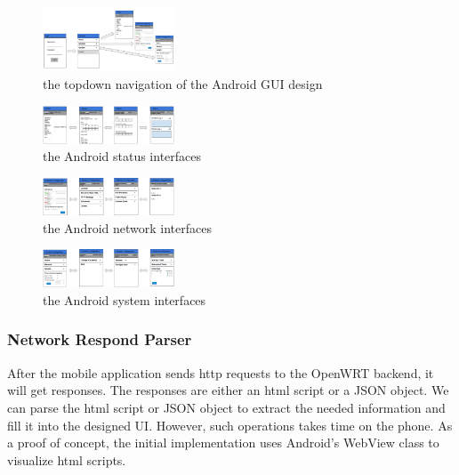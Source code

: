 	\begin{figure}[h!]
		\centering
		\includegraphics[width=0.35\textwidth]{UItopdown.png}
		\caption{the topdown navigation of the Android GUI design}
		\label{OpenWRT:androidtopdown}
	\end{figure}
	\begin{figure}[h!]
		\centering
		\includegraphics[width=0.35\textwidth]{UIstatus.png}
		\caption{the Android status interfaces}
		\label{OpenWRT:androidstatus}
	\end{figure}
	\begin{figure}[h!]
		\centering
		\includegraphics[width=0.35\textwidth]{UInetwork.png}
		\caption{the Android network interfaces}
		\label{OpenWRT:androidnetwork}
	\end{figure}
	\begin{figure}[h!]
		\centering
		\includegraphics[width=0.35\textwidth]{UIsystem.png}
		\caption{the Android system interfaces}
		\label{OpenWRT:androidsystem}
	\end{figure}

\subsubsection{Network Respond Parser}

After the mobile application sends http requests to the OpenWRT backend, it will get responses. The responses are either an html script or a JSON object. We can parse the html script or JSON object to extract the needed information and fill it into the designed UI. However, such operations takes time on the phone. As a proof of concept, the initial implementation uses Android's WebView class to visualize html scripts.

